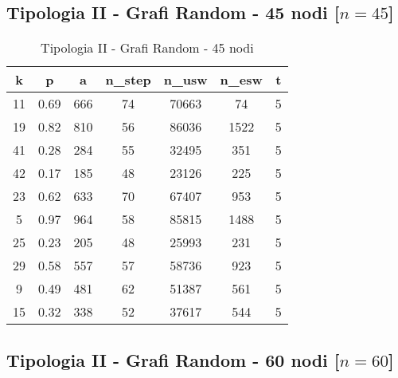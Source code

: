 \subsection{Tipologia II - Grafi Random - 45 nodi [$n=45$]}

\begin{table}[H]
\centering
\begin{tabular}{|c|c|c|c|c|c|c|}
\hline
\textbf{k} & \textbf{p} & \textbf{a} & \textbf{n\_step} & \textbf{n\_usw} & \textbf{n\_esw} & \textbf{t} \\ \hline
11 & 0.69 & 666 & 74 & 70663 & 74 & 5 \\ \hline
19 & 0.82 & 810 & 56 & 86036 & 1522 & 5 \\ \hline
41 & 0.28 & 284 & 55 & 32495 & 351 & 5 \\ \hline
42 & 0.17 & 185 & 48 & 23126 & 225 & 5 \\ \hline
23 & 0.62 & 633 & 70 & 67407 & 953 & 5 \\ \hline
5 & 0.97 & 964 & 58 & 85815 & 1488 & 5 \\ \hline
25 & 0.23 & 205 & 48 & 25993 & 231 & 5 \\ \hline
29 & 0.58 & 557 & 57 & 58736 & 923 & 5 \\ \hline
9 & 0.49 & 481 & 62 & 51387 & 561 & 5 \\ \hline
15 & 0.32 & 338 & 52 & 37617 & 544 & 5 \\ \hline
\end{tabular}
\caption{Tipologia II - Grafi Random - 45 nodi}
\label{tab:sperimentazione-tipo1-45nodi}
\end{table}

\subsection{Tipologia II - Grafi Random - 60 nodi [$n=60$]}

